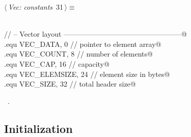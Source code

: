 \documentclass[11pt,a4paper,twoside,openright,DIV=15]{scrbook}
\theoremstyle{definition}
\theoremstyle{plain}
\theoremstyle{remark}
\begin{document}
\begin{flushleft} \small
\begin{minipage}{\linewidth}\label{scrap23}\raggedright\small
{} $\langle\,${\itshape Vec: constants}\nobreak\ {\footnotesize {31}}$\,\rangle\equiv$
\vspace{-1ex}
\begin{list}{}{} \item
\mbox{}\verb@@\\
\mbox{}\verb@// -- Vector layout --------------------------------------------------@\\
\mbox{}\verb@.equ VEC_DATA,      0         // pointer to element array@\\
\mbox{}\verb@.equ VEC_COUNT,     8         // number of elements@\\
\mbox{}\verb@.equ VEC_CAP,      16         // capacity@\\
\mbox{}\verb@.equ VEC_ELEMSIZE, 24         // element size in bytes@\\
\mbox{}\verb@.equ VEC_SIZE,     32         // total header size@\\
\mbox{}\verb@@{\NWsep}
\end{list}
\vspace{-1.5ex}
\footnotesize
\begin{list}{}{\setlength{\itemsep}{-\parsep}\setlength{\itemindent}{-\leftmargin}}
\item \NWtxtMacroRefIn\ .

\item{}
\end{list}
\end{minipage}\vspace{4ex}
\end{flushleft}
\subsection{Initialization}
\end{document}

